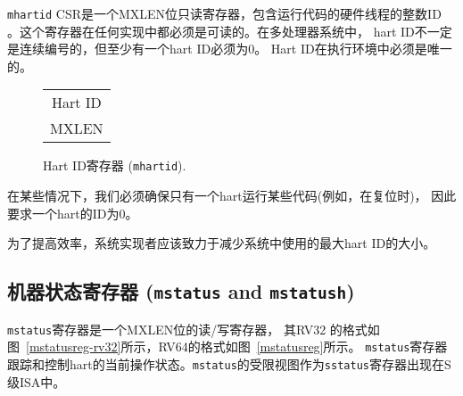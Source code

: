 {\tt mhartid} CSR是一个MXLEN位只读寄存器，包含运行代码的硬件线程的整数ID
 。这个寄存器在任何实现中都必须是可读的。在多处理器系统中，
hart ID不一定是连续编号的，但至少有一个hart ID必须为0。
 Hart ID在执行环境中必须是唯一的。

\begin{figure*}[h!]
{\footnotesize
\begin{center}
\begin{tabular}{J}
 \\
\hline
{}\\
\hline
MXLEN \\
\end{tabular}
\end{center}
}
\vspace{-0.1in}
\caption{Hart ID寄存器 ({\tt mhartid}).}
\label{mhartidreg}
\end{figure*}

\iffalse
\begin{commentary}
In certain cases, we must ensure exactly one hart runs some code
(e.g., at reset), and so require one hart to have a known hart ID of
zero.

For efficiency, system implementers should aim to reduce the magnitude
of the largest hart ID used in a system.
\end{commentary}
\fi

\begin{commentary}
在某些情况下，我们必须确保只有一个hart运行某些代码(例如，在复位时)，
因此要求一个hart的ID为0。

为了提高效率，系统实现者应该致力于减少系统中使用的最大hart ID的大小。
\end{commentary}

\subsection{机器状态寄存器 ({\tt mstatus} and {\tt mstatush})}

\iffalse
The {\tt mstatus} register is an MXLEN-bit read/write register
formatted as shown in Figure~\ref{mstatusreg-rv32} for RV32 and
Figure~\ref{mstatusreg} for RV64.  The {\tt mstatus}
register keeps track of and controls the hart's current operating
state.  A restricted view of {\tt mstatus} appears as the
{\tt sstatus} register in the S-level ISA.
\fi

{\tt mstatus}寄存器是一个MXLEN位的读/写寄存器，
其RV32 的格式如图~\ref{mstatusreg-rv32}所示，RV64的格式如图~\ref{mstatusreg}所示。
{\tt mstatus}寄存器跟踪和控制hart的当前操作状态。{\tt mstatus}的受限视图作为{\tt sstatus}寄存器出现在S级ISA中。

